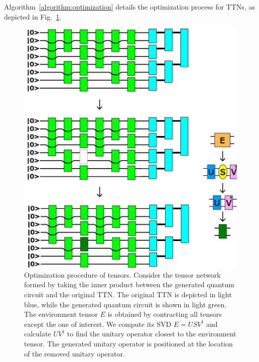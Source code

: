 \documentclass[12pt,dvipdfmx,twoside,openright]{report}
\begin{document}
Algorithm~\ref{algorithm:optimization} details the optimization process for TTNs, as depicted in Fig.~\ref{fig:optimization}.
\begin{figure}
    \centering
    \includegraphics[width=\linewidth]{fig-optimization.pdf}
    \caption{Optimization procedure of tensors. 
    Consider the tensor network formed by taking the inner product between the generated quantum circuit and the original TTN.
    The original TTN is depicted in light blue, while the generated quantum circuit is shown in light green.
    The environment tensor $E$ is obtained by contracting all tensors except the one of interest. We compute its SVD $E=USV^\dagger$ and calculate $UV^\dagger$ to find the unitary operator closest to the environment tensor. The generated unitary operator is positioned at the location of the removed unitary operator.}
    \label{fig:optimization}
\end{figure}
\end{document}
